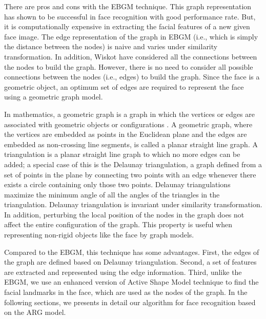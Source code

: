 There are pros and cons with the EBGM technique. This graph
representation has shown to be successful in face recognition with
good performance rate. But, it is computationally expensive in
extracting the facial features of a new given face image. The edge
representation of the graph in EBGM (i.e., which is simply the
distance between the nodes) is naive and varies under similarity
transformation. In addition, Wiskot \etal \cite{Wiskott97} have
considered all the connections between the nodes to build the graph.
However, there is no need to consider all possible connections
between the nodes (i.e., edges) to build the graph. Since the face
is a geometric object, an optimum set of edges are required to
represent the face using a geometric graph model.

In mathematics, a geometric graph is a graph in which the vertices
or edges are associated with geometric objects or configurations
\cite{Bandelt91, Pisanski00}. A geometric graph, where the vertices
are embedded as points in the Euclidean plane and the edges are
embedded as non-crossing line segments, is called a planar straight
line graph. A triangulation is a planar straight line graph to which
no more edges can be added; a special case of this is the Delaunay
triangulation, a graph defined from a set of points in the plane by
connecting two points with an edge whenever there exists a circle
containing only those two points. Delaunay triangulations maximize
the minimum angle of all the angles of the triangles in the
triangulation. Delaunay triangulation is invariant under similarity
transformation. In addition, perturbing the local position of the
nodes in the graph does not affect the entire configuration of the
graph. This property is useful when representing non-rigid objects
like the face by graph models.

Compared to the EBGM, this technique has some advantages. First, the
edges of the graph are defined based on Delaunay triangulation.
Second, a set of features are extracted and represented using the
edge information. Third, unlike the EBGM, we use an enhanced version
of Active Shape Model technique to find the facial landmarks in the
face, which are used as the nodes of the graph. In the following
sections, we presents in detail our algorithm for face recognition
based on the ARG model.

